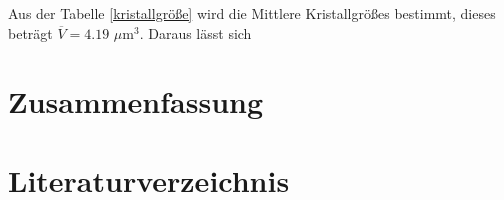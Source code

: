 \documentclass[12pt, a4paper]{article}
\begin{document}
\noindent 
Aus der Tabelle \ref{kristallgröße} wird die Mittlere Kristallgrößes bestimmt, dieses beträgt $\overline{V} = 4.19$ $\mu $m$^3$. Daraus lässt sich 





















\newpage
\section{Zusammenfassung}




\newpage
\section{Literaturverzeichnis}
\printbibliography
\end{document}
